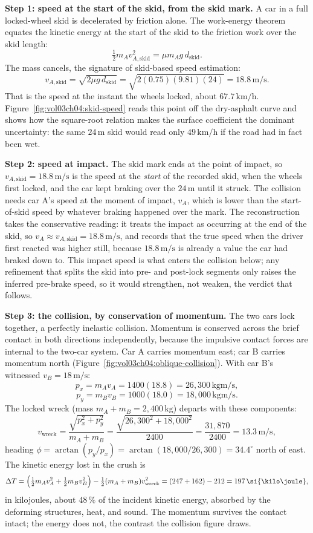 \textbf{Step 1: speed at the start of the skid, from the skid mark.}
A car in a full locked-wheel skid is decelerated by friction alone.
The work-energy theorem equates the kinetic energy at the start of the
skid to the friction work over the skid length:
\[
\tfrac{1}{2}m_{A}v_{A,\text{skid}}^{2}=\mu m_{A} g\,d_{\text{skid}}.
\]
The mass cancels, the signature of skid-based speed estimation:
\[
v_{A,\text{skid}}=\sqrt{2\mu g\,d_{\text{skid}}}=\sqrt{2(0.75)(9.81)
(24)}=18.8\,\si{\meter\per\second}.
\]
That is the speed at the instant the wheels locked, about
$67.7\,\si{\kilo\meter\per\hour}$. Figure~\ref{fig:vol03ch04:skid-speed}
reads this point off the dry-asphalt curve and shows how the square-root
relation makes the surface coefficient the dominant uncertainty: the
same $24\,\si{\meter}$ skid would read only $49\,\si{\kilo\meter\per
\hour}$ if the road had in fact been wet.

\textbf{Step 2: speed at impact.} The skid mark ends at the point of
impact, so $v_{A,\text{skid}}=18.8\,\si{\meter\per\second}$ is the
speed at the \emph{start} of the recorded skid, when the wheels first
locked, and the car kept braking over the $24\,\si{\meter}$ until it
struck. The collision needs car A's speed at the moment of impact,
$v_{A}$, which is lower than the start-of-skid speed by whatever
braking happened over the mark. The reconstruction takes the
conservative reading: it treats the impact as occurring at the end of
the skid, so $v_{A}\approx v_{A,\text{skid}}=18.8\,\si{\meter\per
\second}$, and records that the true speed when the driver first
reacted was higher still, because $18.8\,\si{\meter\per\second}$ is
already a value the car had braked down to. This impact speed is what
enters the collision below; any refinement that splits the skid into
pre- and post-lock segments only raises the inferred pre-brake speed,
so it would strengthen, not weaken, the verdict that follows.

\textbf{Step 3: the collision, by conservation of momentum.} The two
cars lock together, a perfectly inelastic collision. Momentum is
conserved across the brief contact in both directions independently,
because the impulsive contact forces are internal to the two-car
system. Car A carries momentum east; car B carries momentum north
(Figure~\ref{fig:vol03ch04:oblique-collision}). With car B's witnessed
$v_{B}=18\,\si{\meter\per\second}$:
\[
p_{x}=m_{A}v_{A}=1400(18.8)=26{,}300\,\si{\kilogram\meter\per\second},
\]
\[
p_{y}=m_{B}v_{B}=1000(18.0)=18{,}000\,\si{\kilogram\meter\per\second}.
\]
The locked wreck (mass $m_{A}+m_{B}=2{,}400\,\si{\kilogram}$) departs
with these components:
\[
v_{\text{wreck}}=\frac{\sqrt{p_{x}^{2}+p_{y}^{2}}}{m_{A}+m_{B}}
=\frac{\sqrt{26{,}300^{2}+18{,}000^{2}}}{2400}
=\frac{31{,}870}{2400}=13.3\,\si{\meter\per\second},
\]
heading $\phi=\arctan(p_{y}/p_{x})=\arctan(18{,}000/26{,}300)=
34.4^{\circ}$ north of east. The kinetic energy lost in the crush is
\[
\Delta T=\Bigl(\tfrac{1}{2}m_{A}v_{A}^{2}+\tfrac{1}{2}m_{B}v_{B}^{2}
\Bigr)-\tfrac{1}{2}(m_{A}+m_{B})v_{\text{wreck}}^{2}
=(247+162)-212=197\,\si{\kilo\joule},
\]
in kilojoules, about $48\,\%$ of the incident kinetic energy, absorbed
by the deforming structures, heat, and sound. The momentum survives the
contact intact; the energy does not, the contrast the collision figure
draws.

